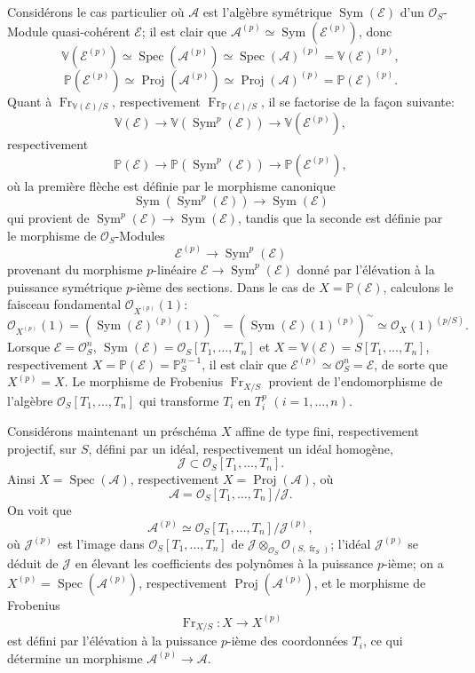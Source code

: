 \documentclass[11pt]{article}
\DeclareMathOperator{\Spec}{Spec}
\providecommand{\OO}{\mathcal{O}}
\providecommand{\cE}{\mathcal E}
\providecommand{\Spec}{\operatorname{Spec}}
\providecommand{\Sym}{\operatorname{Sym}}
\providecommand{\Spec}{\operatorname{Spec}}
\providecommand{\Spec}{\operatorname{Spec}}
\providecommand{\fr}{\operatorname{fr}}
\providecommand{\Fr}{\operatorname{Fr}}
\providecommand{\Proj}{\operatorname{Proj}}
\providecommand{\Sym}{\operatorname{Sym}}
\providecommand{\JJ}{\mathcal J}
\providecommand{\Fr}{\operatorname{Fr}}
\providecommand{\fr}{\operatorname{fr}}
\providecommand{\Spec}{\operatorname{Spec}}
\begin{document}
Considérons le cas particulier où $\mathcal{A}$ est l'algèbre symétrique $\Sym(\cE)$ d'un $\OO_S$-Module quasi-cohérent $\cE$; il est clair que $\mathcal{A}^{(p)}\simeq\Sym(\cE^{(p)})$, donc
\[
\mathbb V(\cE^{(p)})\simeq\Spec(\mathcal{A}^{(p)})\simeq\Spec(\mathcal{A})^{(p)}=\mathbb V(\cE)^{(p)},
\]
\[
\mathbb P(\cE^{(p)})\simeq\Proj(\mathcal{A}^{(p)})\simeq\Proj(\mathcal{A})^{(p)}=\mathbb P(\cE)^{(p)}.
\]
Quant à $\Fr_{\mathbb V(\cE)/S}$, respectivement $\Fr_{\mathbb P(\cE)/S}$, il se factorise de la façon suivante:
\[
\mathbb V(\cE)\longrightarrow \mathbb V(\Sym^p(\cE))\longrightarrow \mathbb V(\cE^{(p)}),
\]
respectivement
\[
\mathbb P(\cE)\longrightarrow \mathbb P(\Sym^p(\cE))\longrightarrow \mathbb P(\cE^{(p)}),
\]
où la première flèche est définie par le morphisme canonique
\[
\Sym(\Sym^p(\cE))\longrightarrow \Sym(\cE)
\]
qui provient de $\Sym^p(\cE)\to\Sym(\cE)$, tandis que la seconde est définie par le morphisme de $\OO_S$-Modules
\[
\cE^{(p)}\longrightarrow \Sym^p(\cE)
\]
provenant du morphisme $p$-linéaire $\cE\to\Sym^p(\cE)$ donné par l'élévation à la puissance symétrique $p$-ième des sections. Dans le cas de $X=\mathbb P(\cE)$, calculons le faisceau fondamental $\OO_{X^{(p)}}(1)$:
\[
\OO_{X^{(p)}}(1)=(\Sym(\cE)^{(p)}(1))^{\sim}
=(\Sym(\cE)(1)^{(p)})^{\sim}
\simeq \OO_X(1)^{(p/S)}.
\]
Lorsque $\cE=\OO_S^n$, $\Sym(\cE)=\OO_S[T_1,\ldots,T_n]$ et $X=\mathbb V(\cE)=S[T_1,\ldots,T_n]$, respectivement $X=\mathbb P(\cE)=\mathbb P_S^{n-1}$, il est clair que $\cE^{(p)}\simeq\OO_S^n=\cE$, de sorte que $X^{(p)}=X$. Le morphisme de Frobenius $\Fr_{X/S}$ provient de l'endomorphisme de l'algèbre $\OO_S[T_1,\ldots,T_n]$ qui transforme $T_i$ en $T_i^p$ $(i=1,\ldots,n)$.

Considérons maintenant un préschéma $X$ affine de type fini, respectivement projectif, sur $S$, défini par un idéal, respectivement un idéal homogène,
\[
\JJ\subset \OO_S[T_1,\ldots,T_n].
\]
Ainsi $X=\Spec(\mathcal{A})$, respectivement $X=\Proj(\mathcal{A})$, où
\[
\mathcal{A}=\OO_S[T_1,\ldots,T_n]/\JJ.
\]
On voit que
\[
\mathcal{A}^{(p)}\simeq \OO_S[T_1,\ldots,T_n]/\JJ^{(p)},
\]
où $\JJ^{(p)}$ est l'image dans $\OO_S[T_1,\ldots,T_n]$ de $\JJ\otimes_{\OO_S}\OO_{(S,\fr_S)}$; l'idéal $\JJ^{(p)}$ se déduit de $\JJ$ en élevant les coefficients des polynômes à la puissance $p$-ième; on a $X^{(p)}=\Spec(\mathcal{A}^{(p)})$, respectivement $\Proj(\mathcal{A}^{(p)})$, et le morphisme de Frobenius
\[
\Fr_{X/S}:X\longrightarrow X^{(p)}
\]
est défini par l'élévation à la puissance $p$-ième des coordonnées $T_i$, ce qui détermine un morphisme $\mathcal{A}^{(p)}\to\mathcal{A}$.
\end{document}
